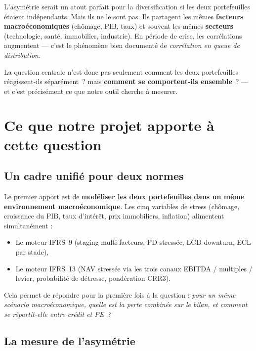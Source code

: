 \documentclass[12pt,a4paper]{article}
\begin{document}
L'asymétrie serait un atout parfait pour la diversification si les deux portefeuilles étaient indépendants. Mais ils ne le sont pas. Ils partagent les mêmes \textbf{facteurs macroéconomiques} (chômage, PIB, taux) et souvent les mêmes \textbf{secteurs} (technologie, santé, immobilier, industrie). En période de crise, les corrélations augmentent --- c'est le phénomène bien documenté de \textit{corrélation en queue de distribution}.

La question centrale n'est donc pas seulement \og comment les deux portefeuilles réagissent-ils séparément~?\fg{} mais \og \textbf{comment se comportent-ils ensemble}~?\fg{} --- et c'est précisément ce que notre outil cherche à mesurer.

\section{Ce que notre projet apporte à cette question}

\subsection{Un cadre unifié pour deux normes}

Le premier apport est de \textbf{modéliser les deux portefeuilles dans un même environnement macroéconomique}. Les cinq variables de stress (chômage, croissance du PIB, taux d'intérêt, prix immobiliers, inflation) alimentent simultanément :

\begin{itemize}
  \item Le moteur IFRS~9 (staging multi-facteurs, PD stressée, LGD downturn, ECL par stade),
  \item Le moteur IFRS~13 (NAV stressée via les trois canaux EBITDA / multiples / levier, probabilité de détresse, pondération CRR3).
\end{itemize}

Cela permet de répondre pour la première fois à la question : \textit{pour un même scénario macroéconomique, quelle est la perte combinée sur le bilan, et comment se répartit-elle entre crédit et PE~?}

\subsection{La mesure de l'asymétrie}
\end{document}
